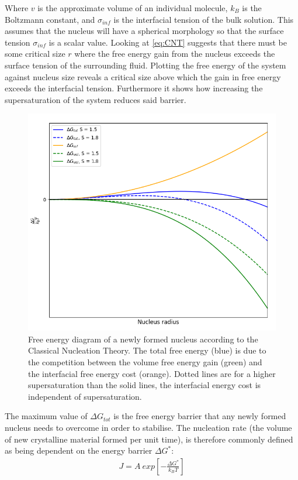 Where $v$ is the approximate volume of an individual molecule, $k_B$ is 
the Boltzmann constant, and $\sigma_{inf}$ is the interfacial tension of 
the bulk solution. This assumes that the nucleus will have a spherical 
morphology so that the surface tension $\sigma_{inf}$ is a scalar value. 
Looking at \eqref{eq:CNT} suggests that there must be some critical size 
$r$ where the free energy gain from the nucleus exceeds the surface tension 
of the surrounding fluid. Plotting the free energy of the system against 
nucleus size reveals a critical size above which the gain in free energy 
exceeds the interfacial tension. Furthermore it shows how increasing the 
supersaturation of the system reduces said barrier. 
\begin{figure}[h!]
	\centering
	\includegraphics[width=\linewidth]{Free_Energy_Diagram.png}
	\caption{Free energy diagram of a newly formed nucleus according 
		     to the Classical Nucleation Theory. The total free energy (blue)
		     is due to the competition between the volume free energy gain
		     (green) and the interfacial free energy cost (orange). Dotted
		     lines are for a higher supersaturation than the solid lines,
		     the interfacial energy cost is independent of supersaturation.}
	     \label{fig:free_energy}
\end{figure}

The maximum value of $\Delta G_{tot}$ is the free energy barrier that any 
newly formed nucleus needs to overcome in order to stabilise. The nucleation 
rate (the volume of new crystalline material formed per unit time), is 
therefore commonly defined as being dependent on the energy barrier $\Delta G^*$:
\begin{align}
	J = A \ exp \left[-\frac{\Delta G^*}{k_BT} \right]
\end{align}

